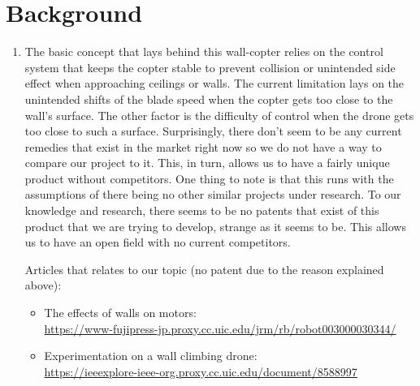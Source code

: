 \documentclass[12pt]{article}
\begin{document}
    \section{Background}
        \begin{enumerate}[label=\Alph*.]
            \item The basic concept that lays behind this wall-copter relies on the control system that keeps the copter stable to prevent collision or unintended side effect when approaching ceilings or walls. The current limitation lays on the unintended shifts of the blade speed when the copter gets too close to the wall's surface. The other factor is the difficulty of control when the drone gets too close to such a surface. Surprisingly, there don't seem to be any current remedies that exist in the market right now so we do not have a way to compare our project to it. This, in turn, allows us to have a fairly unique product without competitors. One thing to note is that this runs with the assumptions of there being no other similar projects under research. To our knowledge and research, there seems to be no patents that exist of this product that we are trying to develop, strange as it seems to be. This allows us to have an open field with no current competitors.
            
            Articles that relates to our topic (no patent due to the reason explained above): 
            \begin{itemize}[label=]
                \item The effects of walls on motors:\\\url{https://www-fujipress-jp.proxy.cc.uic.edu/jrm/rb/robot003000030344/}
                \item Experimentation on a wall climbing drone:\\\url{https://ieeexplore-ieee-org.proxy.cc.uic.edu/document/8588997}
            \end{itemize}


\end{enumerate}
\end{document}
